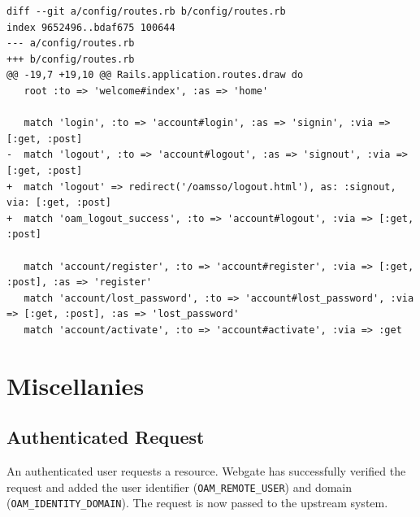 \documentclass[11pt]{report}
\begin{document}
\begin{Verbatim}[label=Changes for Logout]
diff --git a/config/routes.rb b/config/routes.rb
index 9652496..bdaf675 100644
--- a/config/routes.rb
+++ b/config/routes.rb
@@ -19,7 +19,10 @@ Rails.application.routes.draw do
   root :to => 'welcome#index', :as => 'home'

   match 'login', :to => 'account#login', :as => 'signin', :via => [:get, :post]
-  match 'logout', :to => 'account#logout', :as => 'signout', :via => [:get, :post]
+  match 'logout' => redirect('/oamsso/logout.html'), as: :signout, via: [:get, :post]
+  match 'oam_logout_success', :to => 'account#logout', :via => [:get, :post]

   match 'account/register', :to => 'account#register', :via => [:get, :post], :as => 'register'
   match 'account/lost_password', :to => 'account#lost_password', :via => [:get, :post], :as => 'lost_password'
   match 'account/activate', :to => 'account#activate', :via => :get
\end{Verbatim}



\chapter{Miscellanies}


\section{Authenticated Request}

An authenticated user requests a resource. Webgate has successfully verified the
request and added the user identifier (\verb|OAM_REMOTE_USER|) and domain
(\verb|OAM_IDENTITY_DOMAIN|). The request is now passed to the upstream system.
\end{document}
